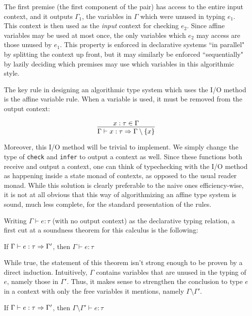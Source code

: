 The first premise (the first component of the pair) has access to the entire input context, and it outputs $\Gamma_1$, the variables in $\Gamma$ which were unused in typing $e_1$. This context is then used as the \textit{input} context for checking $e_2$. Since affine variables may be used at most once, the only variables which $e_2$ may access are those unused by $e_1$. This property is enforced in declarative systems ``in parallel" by splitting the context up front, but it may similarly be enforced ``sequentially" by lazily deciding which premises may use which variables in this algorithmic style.

The key rule in designing an algorithmic type system which uses the I/O method is the affine variable rule. When a variable is used, it must be removed from the output context:

$$
\infer{\Gamma \vdash x : \tau \gens \Gamma \setminus \{x\}}{x : \tau \in \Gamma}
$$

Moreover, this I/O method will be trivial to implement. We simply change the type of \texttt{check} and \texttt{infer} to output a context as well. Since these functions both receive and output a context, one can think of typechecking with the I/O method as happening inside a state monad of contexts, as opposed to the usual reader monad. While this solution is clearly preferable to the naive ones efficiency-wise, it is not at all obvious that this way of algorithmizing an affine type system is sound, much less complete, for the standard presentation of the rules. 

Writing $\Gamma \vdash e : \tau$ (with no output context) as the declarative typing relation, a first cut at a soundness theorem for this calculus is the following:

\begin{theorem}
If $\Gamma \vdash e : \tau \Rightarrow \Gamma'$, then $\Gamma \vdash e : \tau$
\end{theorem}

While true, the statement of this theorem isn't strong enough to be proven by a direct induction. Intuitively, $\Gamma$ contains variables that are unused in the typing of $e$, namely those in $\Gamma'$. Thus, it makes sense to strengthen the conclusion to type $e$ in a context with only the free variables it mentions, namely $\Gamma \setminus \Gamma'$.

\begin{theorem}
If $\Gamma \vdash e : \tau \Rightarrow \Gamma'$, then $\Gamma \setminus \Gamma' \vdash e : \tau$
\end{theorem}

